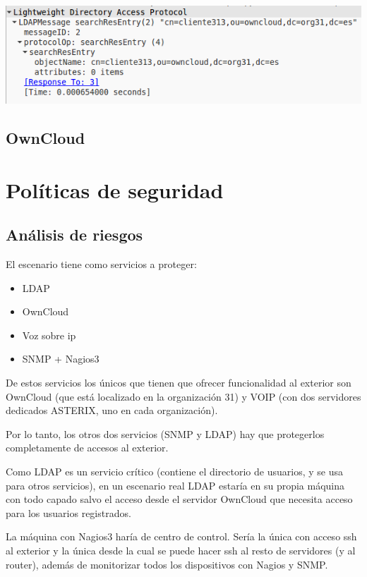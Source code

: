 \documentclass[]{article}
\begin{document}
\begin{center}
	\includegraphics[scale=0.5]{images/ldap/ldap6}
\end{center}




\subsection{OwnCloud}
\section{Políticas de seguridad}

\subsection{Análisis de riesgos}
El escenario tiene como servicios a proteger:

\begin{itemize}
	\item LDAP
	\item OwnCloud
	\item Voz sobre ip
	\item SNMP + Nagios3
\end{itemize}

De estos servicios los únicos que tienen que ofrecer funcionalidad al exterior son OwnCloud (que está localizado en la organización 31) y VOIP (con dos servidores dedicados ASTERIX, uno en cada organización).

Por lo tanto, los otros dos servicios (SNMP y LDAP) hay que protegerlos completamente de accesos al exterior. 

Como LDAP es un servicio crítico (contiene el directorio de usuarios, y se usa para otros servicios), en un escenario real LDAP estaría en su propia máquina con todo capado salvo el acceso desde el servidor OwnCloud que necesita acceso para los usuarios registrados.

La máquina con Nagios3 haría de centro de control. Sería la única con acceso ssh al exterior y la única desde la cual se puede hacer ssh al resto de servidores (y al router), además de monitorizar todos los dispositivos con Nagios y SNMP.
\end{document}
